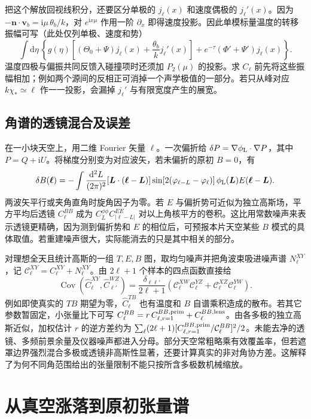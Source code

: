 把这个解放回视线积分，还要区分单极的 $j_\ell(x)$ 和速度偶极的 $j_\ell'(x)$。因为 $-\bm n\cdot\bm v_b=\mathrm i\mu\,\theta_b/k$，对 $e^{\mathrm ix\mu}$ 作用一阶 $\partial_x$ 即得速度投影。因此单模标量温度的转移振幅可写（此处仅列单极、速度和势）
\[
 \int \mathrm d\eta\,\left\{
 g(\eta)\left[(\Theta_0+\Psi)j_\ell(x)+\frac{\theta_b}{k}j_\ell'(x)\right]
 +e^{-\tau}(\Phi'+\Psi')j_\ell(x)\right\}.
\]
温度四极与偏振共同反馈入碰撞项时还须加 $P_2(\mu)$ 的投影。求 $C_\ell$ 前先将这些振幅相加；例如两个源间的反相正可消掉一个声学极值的一部分。若只从峰对应 $k\chi_*\simeq\ell$ 作一一投影，会漏掉 $j_\ell'$ 与有限宽度产生的展宽。

\subsection{角谱的透镜混合及误差}

在一小块天空上，用二维 Fourier 矢量 $\bm\ell$。一次偏折给 $\delta P=\nabla\phi_{\rm L}\cdot\nabla P$，其中 $P=Q+\mathrm iU$。将梯度分别变为对应波矢，若未偏折的原初 $B=0$，有
\[
 \delta B(\bm\ell)=-\int\frac{\mathrm d^2L}{(2\pi)^2}
 [\bm L\cdot(\bm\ell-\bm L)]
 \sin[2(\varphi_{\ell-L}-\varphi_\ell)]\,
 \phi_{\rm L}(\bm L)E(\bm\ell-\bm L).
\]
两波矢平行或夹角直角时旋角因子为零。若 $E$ 与偏折势可近似为独立高斯场，平方平均后透镜 $C_\ell^{BB}$ 成为 $C_L^{\phi\phi}C_{|\ell-L|}^{EE}$ 对以上角核平方的卷积。这比用常数噪声来表示透镜更精确，因为测到偏折势和 $E$ 的相位后，可预报本片天空某些 $B$ 模式的具体取值。若重建噪声很大，实际能消去的只是其中相关的部分。

对理想全天且统计高斯的一组 $T,E,B$ 图，取均匀噪声并把角波束吸进噪声谱 $N_\ell^{XY}$，记 $\mathcal C_\ell^{XY}=C_\ell^{XY}+N_\ell^{XY}$。由 $2\ell+1$ 个样本的四点函数直接给
\[
 \operatorname{Cov}(\widehat C_\ell^{XY},\widehat C_{\ell'}^{WZ})
 =\frac{\delta_{\ell\ell'}}{2\ell+1}
 \left(\mathcal C_\ell^{XW}\mathcal C_\ell^{YZ}
     +\mathcal C_\ell^{XZ}\mathcal C_\ell^{YW}\right).
\]
例如即使真实的 $TB$ 期望为零，$\widehat C_\ell^{TB}$ 也有温度和 $B$ 自谱乘积造成的散布。若其它参数暂固定，小张量比下可写 $C_\ell^{BB}=r\,C_{\ell,r=1}^{BB,{\rm prim}}+C_\ell^{BB,{\rm lens}}$。由各多极的独立高斯近似，加权估计 $r$ 的逆方差约为
$\sum_{\ell}(2\ell+1)[C_{\ell,r=1}^{BB,{\rm prim}}/\mathcal C_\ell^{BB}]^2/2$。未能去净的透镜、多频前景余量及仪器噪声都进入分母。部分天空常粗略乘有效覆盖率，但若遮罩边界强烈混合多极或透镜非高斯性显著，还要计算真实的非对角协方差。这解释了为何不同角范围给出的张量限制不能只按所含多极数机械缩放。
\section{从真空涨落到原初张量谱}\label{sec:gw-dinfl}

